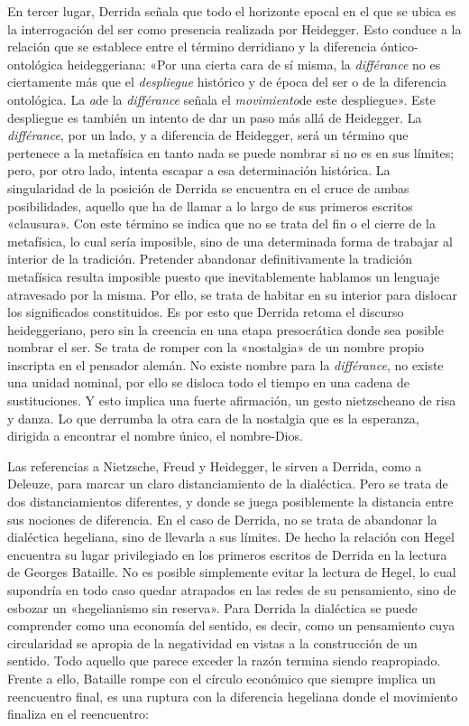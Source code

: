 En tercer lugar, Derrida señala que todo el horizonte epocal en el que se ubica es la interrogación del ser como presencia realizada por Heidegger. Esto conduce a la relación que se establece entre el término derridiano y la diferencia óntico-ontológica heideggeriana: «Por una cierta cara de sí misma, la \emph{différance} no es ciertamente más que el \emph{despliegue} histórico y de época del ser o de la diferencia ontológica. La \emph{a}de la \emph{différance} señala el \emph{movimiento}de este despliegue». Este despliegue es también un intento de dar un paso más allá de Heidegger. La \emph{différance}, por un lado, y a diferencia de Heidegger, será un término que pertenece a la metafísica en tanto nada se puede nombrar si no es en sus límites; pero, por otro lado, intenta escapar a esa determinación histórica. La singularidad de la posición de Derrida se encuentra en el cruce de ambas posibilidades, aquello que ha de llamar a lo largo de sus primeros escritos «clausura». Con este término se indica que no se trata del fin o el cierre de la metafísica, lo cual sería imposible, sino de una determinada forma de trabajar al interior de la tradición. Pretender abandonar definitivamente la tradición metafísica resulta imposible puesto que inevitablemente hablamos un lenguaje atravesado por la misma. Por ello, se trata de habitar en su interior para dislocar los significados constituidos. Es por esto que Derrida retoma el discurso heideggeriano, pero sin la creencia en una etapa presocrática donde sea posible nombrar el ser. Se trata de romper con la «nostalgia» de un nombre propio inscripta en el pensador alemán. No existe nombre para la \emph{différance}, no existe una unidad nominal, por ello se disloca todo el tiempo en una cadena de sustituciones. Y esto implica una fuerte afirmación, un gesto nietzscheano de risa y danza. Lo que derrumba la otra cara de la nostalgia que es la esperanza, dirigida a encontrar el nombre único, el nombre-Dios.

Las referencias a Nietzsche, Freud y Heidegger, le sirven a Derrida, como a Deleuze, para marcar un claro distanciamiento de la dialéctica. Pero se trata de dos distanciamientos diferentes, y donde se juega posiblemente la distancia entre sus nociones de diferencia. En el caso de Derrida, no se trata de abandonar la dialéctica hegeliana, sino de llevarla a sus límites. De hecho la relación con Hegel encuentra su lugar privilegiado en los primeros escritos de Derrida en la lectura de Georges Bataille. No es posible simplemente evitar la lectura de Hegel, lo cual supondría en todo caso quedar atrapados en las redes de su pensamiento, sino de esbozar un «hegelianismo sin reserva». Para Derrida la dialéctica se puede comprender como una economía del sentido, es decir, como un pensamiento cuya circularidad se apropia de la negatividad en vistas a la construcción de un sentido. Todo aquello que parece exceder la razón termina siendo reapropiado. Frente a ello, Bataille rompe con el círculo económico que siempre implica un reencuentro final, es una ruptura con la diferencia hegeliana donde el movimiento finaliza en el reencuentro:

